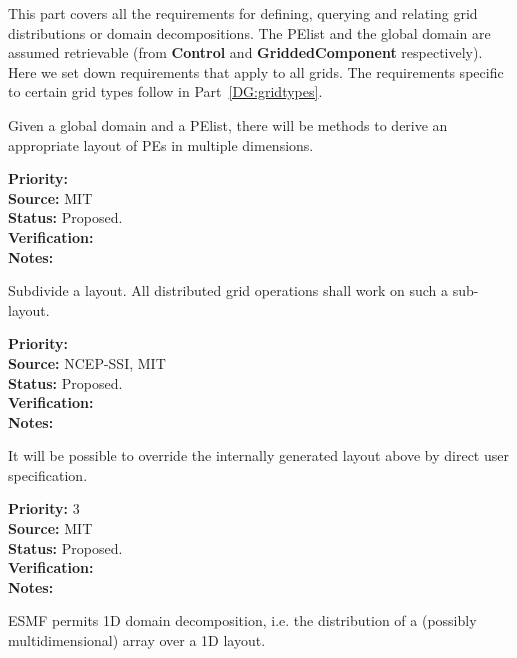 
This part covers all the requirements for defining, querying and
relating grid distributions or domain decompositions. The PElist and
the global domain are assumed retrievable (from \textbf{Control} and
\textbf{GriddedComponent} respectively). Here we set down requirements
that apply to all grids. The requirements specific to certain grid
types follow in Part~\ref{DG:gridtypes}.



Given a global domain and a PElist, there will be methods to derive an
appropriate layout of PEs in multiple dimensions.

\begin{reqlist}
{\bf Priority:} \\
{\bf Source:} MIT \\
{\bf Status:} Proposed. \\
{\bf Verification:} \\
{\bf Notes:}
\end{reqlist}


Subdivide a layout.  All distributed grid operations shall work on such a sub-layout.

\begin{reqlist}
{\bf Priority:} \\
{\bf Source:} NCEP-SSI, MIT \\
{\bf Status:} Proposed. \\
{\bf Verification:} \\
{\bf Notes:}
\end{reqlist}


It will be possible to override the internally generated layout above
by direct user specification.

\begin{reqlist}
{\bf Priority:} 3 \\ 
{\bf Source:} MIT \\
{\bf Status:} Proposed. \\
{\bf Verification:} \\
{\bf Notes:}
\end{reqlist}


ESMF permits 1D domain decomposition, i.e. the distribution of a
(possibly multidimensional) array over a 1D layout.

